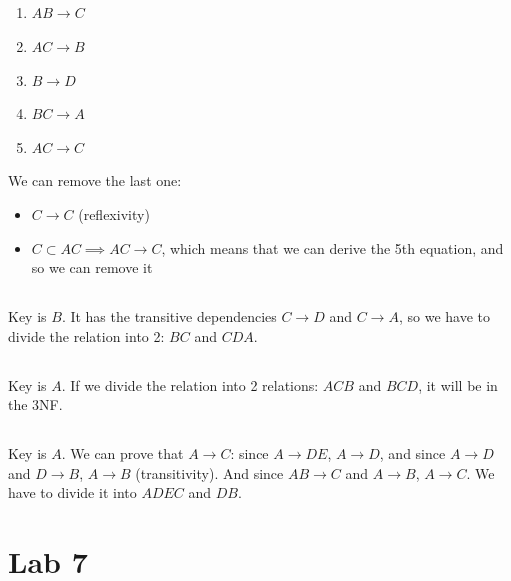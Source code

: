 \documentclass[a4paper]{article}
\begin{document}
\subsection{}
\begin{enumerate}
    \item $AB \to C$
    \item $AC \to B$
    \item $B \to D$
    \item $BC \to A$
    \item $AC \to C $
\end{enumerate}
We can remove the last one:
\begin{itemize}
    \item $C \to C$ (reflexivity)
    \item $C \subset AC \implies AC \to C$, which means that we can derive the 5th equation, and so we can remove it
\end{itemize}
\subsection{}
Key is $B$. It has the transitive dependencies $C \to D$ and $C \to A$, so we have to divide the relation into 2: $BC$ and $CDA$.
\subsection{}
Key is $A$. If we divide the relation into 2 relations: $ACB$ and $BCD$, it will be in the 3NF.%
\subsection{}
Key is $A$. We can prove that $A \to C$: since $A \to DE$, $A \to D$, and since $A \to D$ and $D \to B$, $A \to B$ (transitivity). And since $AB \to C$ and $A \to B$, $A \to C$. We have to divide it into $ADEC$ and $DB$.
\section{Lab 7}
\end{document}
